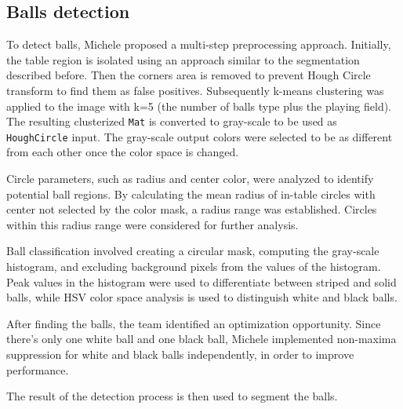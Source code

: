 \subsection{Balls detection}
To detect balls, Michele proposed a multi-step preprocessing approach. Initially, the table region is isolated using an approach similar to the segmentation described before. Then the corners area is removed to prevent Hough Circle transform to find them as false positives. Subsequently k-means clustering was applied to the image with k=5 (the number of balls type plus the playing field). The resulting clusterized \texttt{Mat} is converted to gray-scale to be used as \texttt{HoughCircle} input. The gray-scale output colors were selected to be as different from each other once the color space is changed.

Circle parameters, such as radius and center color, were analyzed to identify potential ball regions. By calculating the mean radius of in-table circles with center not selected by the color mask, a radius range was established. Circles within this radius range were considered for further analysis.

Ball classification involved creating a circular mask, computing the gray-scale histogram, and excluding background pixels from the values of the histogram. Peak values in the histogram were used to differentiate between striped and solid balls, while HSV color space analysis is used to distinguish white and black balls.

After finding the balls, the team identified an optimization opportunity. Since there's only one white ball and one black ball, Michele implemented non-maxima suppression for white and black balls independently, in order to improve performance.

The result of the detection process is then used to segment the balls.
